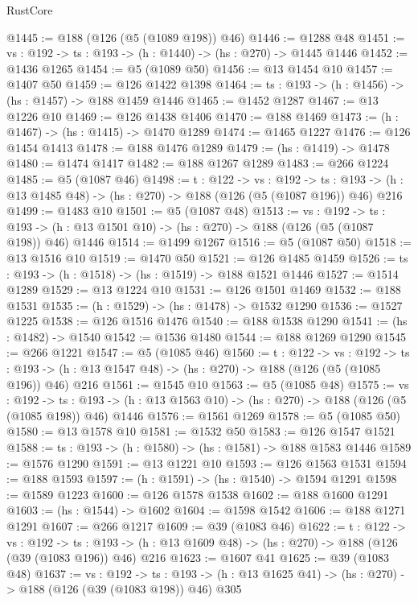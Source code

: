 \begin{lexlean}{RustCore}
\begin{coremodule}
@1445 := @188 (@126 (@5 (@1089 @198)) @46)
@1446 := @1288 @48
@1451 := {vs : @192} -> {ts : @193} -> (h : @1440) -> (hs : @270) -> @1445 @1446
@1452 := @1436 @1265
@1454 := @5 (@1089 @50)
@1456 := @13 @1454 @10
@1457 := @1407 @50
@1459 := @126 @1422 @1398
@1464 := {ts : @193} -> (h : @1456) -> (hs : @1457) -> @188 @1459 @1446
@1465 := @1452 @1287
@1467 := @13 @1226 @10
@1469 := @126 @1438 @1406
@1470 := @188 @1469
@1473 := (h : @1467) -> (hs : @1415) -> @1470 @1289
@1474 := @1465 @1227
@1476 := @126 @1454 @1413
@1478 := @188 @1476 @1289
@1479 := (hs : @1419) -> @1478
@1480 := @1474 @1417
@1482 := @188 @1267 @1289
@1483 := @266 @1224
@1485 := @5 (@1087 @46)
@1498 := {t : @122} ->
  {vs : @192} ->
  {ts : @193} -> (h : @13 @1485 @48) -> (hs : @270) -> @188 (@126 (@5 (@1087 @196)) @46) @216
@1499 := @1483 @10
@1501 := @5 (@1087 @48)
@1513 := {vs : @192} ->
  {ts : @193} -> (h : @13 @1501 @10) -> (hs : @270) -> @188 (@126 (@5 (@1087 @198)) @46) @1446
@1514 := @1499 @1267
@1516 := @5 (@1087 @50)
@1518 := @13 @1516 @10
@1519 := @1470 @50
@1521 := @126 @1485 @1459
@1526 := {ts : @193} -> (h : @1518) -> (hs : @1519) -> @188 @1521 @1446
@1527 := @1514 @1289
@1529 := @13 @1224 @10
@1531 := @126 @1501 @1469
@1532 := @188 @1531
@1535 := (h : @1529) -> (hs : @1478) -> @1532 @1290
@1536 := @1527 @1225
@1538 := @126 @1516 @1476
@1540 := @188 @1538 @1290
@1541 := (hs : @1482) -> @1540
@1542 := @1536 @1480
@1544 := @188 @1269 @1290
@1545 := @266 @1221
@1547 := @5 (@1085 @46)
@1560 := {t : @122} ->
  {vs : @192} ->
  {ts : @193} -> (h : @13 @1547 @48) -> (hs : @270) -> @188 (@126 (@5 (@1085 @196)) @46) @216
@1561 := @1545 @10
@1563 := @5 (@1085 @48)
@1575 := {vs : @192} ->
  {ts : @193} -> (h : @13 @1563 @10) -> (hs : @270) -> @188 (@126 (@5 (@1085 @198)) @46) @1446
@1576 := @1561 @1269
@1578 := @5 (@1085 @50)
@1580 := @13 @1578 @10
@1581 := @1532 @50
@1583 := @126 @1547 @1521
@1588 := {ts : @193} -> (h : @1580) -> (hs : @1581) -> @188 @1583 @1446
@1589 := @1576 @1290
@1591 := @13 @1221 @10
@1593 := @126 @1563 @1531
@1594 := @188 @1593
@1597 := (h : @1591) -> (hs : @1540) -> @1594 @1291
@1598 := @1589 @1223
@1600 := @126 @1578 @1538
@1602 := @188 @1600 @1291
@1603 := (hs : @1544) -> @1602
@1604 := @1598 @1542
@1606 := @188 @1271 @1291
@1607 := @266 @1217
@1609 := @39 (@1083 @46)
@1622 := {t : @122} ->
  {vs : @192} ->
  {ts : @193} -> (h : @13 @1609 @48) -> (hs : @270) -> @188 (@126 (@39 (@1083 @196)) @46) @216
@1623 := @1607 @41
@1625 := @39 (@1083 @48)
@1637 := {vs : @192} ->
  {ts : @193} -> (h : @13 @1625 @41) -> (hs : @270) -> @188 (@126 (@39 (@1083 @198)) @46) @305

\end{coremodule}
\end{lexlean}

